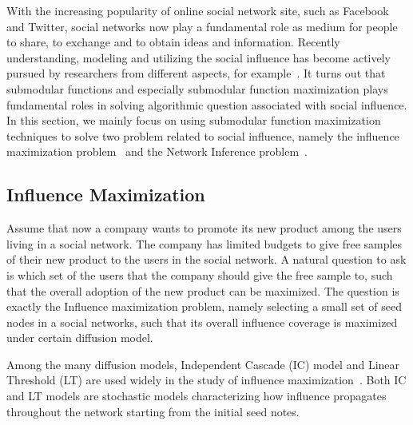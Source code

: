With the increasing popularity of online social network site, such as Facebook and Twitter, social networks now play a fundamental role as medium for people to share, to exchange and to obtain ideas and information. Recently understanding, modeling and utilizing the social influence has become actively pursued by researchers from different aspects, for example~\cite{GJA10,KKT03,GB12,Bharathi:2007,Borodin:2010,chen2011influence,he2012influence,Budak:2011}. It turns out that submodular functions and especially submodular function maximization plays fundamental roles in solving algorithmic question associated with social influence. In this section, we mainly focus on using submodular function maximization techniques to solve two problem related to social influence, namely the influence maximization problem~\cite{KKT03} and the Network Inference problem~\cite{GJA10}.
\subsection{Influence Maximization}
Assume that now a company wants to promote its new product among the users living in a social network. The company has limited budgets to give free samples of their new product to the users in the social network. A natural question to ask is which set of the users that the company should give the free sample to, such that the overall adoption of the new product can be maximized. The question is exactly the Influence maximization problem, namely selecting a small set of seed nodes in a social networks, such that its overall influence coverage is maximized under certain diffusion model.

Among the many diffusion models, Independent Cascade (IC) model and Linear Threshold (LT) are used widely in the study of influence maximization~\cite{KKT03}. Both IC and LT models are stochastic models characterizing how influence propagates throughout the network starting from the initial seed notes.

%

